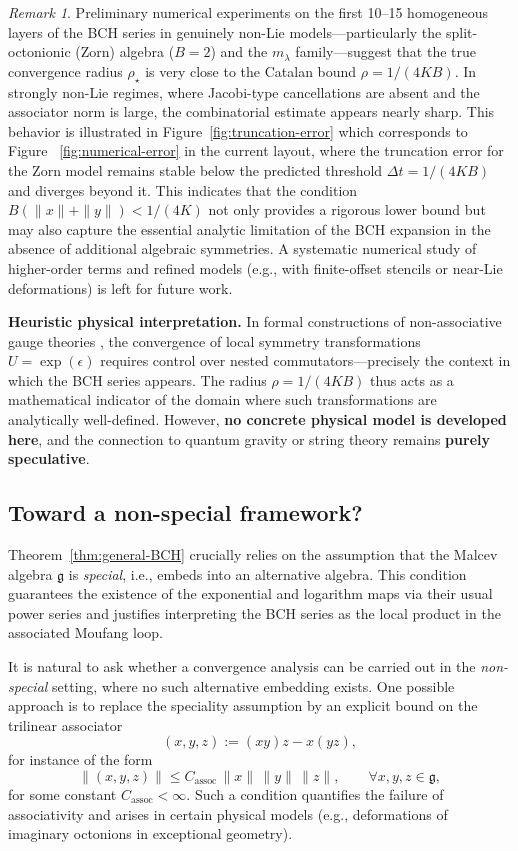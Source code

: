 \documentclass[11pt]{amsart}
\numberwithin{equation}{section}
\theoremstyle{remark}
\newtheorem{remark}[theorem]{Remark}
\begin{document}
\begin{remark}
\label{rem:numerical}
Preliminary numerical experiments on the first 10–15 homogeneous layers of the BCH series in genuinely non-Lie models—particularly the split-octonionic (Zorn) algebra ($B = 2$) and the $m_\lambda$ family—suggest that the true convergence radius $\rho_\star$ is very close to the Catalan bound $\rho = 1/(4KB)$. In strongly non-Lie regimes, where Jacobi-type cancellations are absent and the associator norm is large, the combinatorial estimate appears nearly sharp. This behavior is illustrated in Figure~\ref{fig:truncation-error} which corresponds to Figure ~\ref{fig:numerical-error} in the current layout, where the truncation error for the Zorn model remains stable below the predicted threshold $\Delta t = 1/(4KB)$ and diverges beyond it. This indicates that the condition $B(\|x\| + \|y\|) < 1/(4K)$ not only provides a rigorous lower bound but may also capture the essential analytic limitation of the BCH expansion in the absence of additional algebraic symmetries. A systematic numerical study of higher-order terms and refined models (e.g., with finite-offset stencils or near-Lie deformations) is left for future work.
\end{remark}
\bigskip
\textbf{Heuristic physical interpretation.} In formal 
constructions of non-associative gauge theories 
\cite{GursyTze,Okubo}, the convergence of local symmetry 
transformations $U = \exp(\epsilon)$ requires control over 
nested commutators---precisely the context in which the BCH 
series appears. The radius $\rho = 1/(4KB)$ thus acts as a 
mathematical indicator of the domain where such 
transformations are analytically well-defined. However, 
\textbf{no concrete physical model is developed here}, and 
the connection to quantum gravity or string theory remains 
\textbf{purely speculative}.

\subsection{Toward a non-special framework?}\label{sec:non-special}

Theorem~\ref{thm:general-BCH} crucially relies on the assumption that the Malcev algebra $\mathfrak{g}$ is \emph{special}, i.e., embeds into an alternative algebra. This condition guarantees the existence of the exponential and logarithm maps via their usual power series and justifies interpreting the BCH series as the local product in the associated Moufang loop.

It is natural to ask whether a convergence analysis can be carried out in the \emph{non-special} setting, where no such alternative embedding exists. One possible approach is to replace the speciality assumption by an explicit bound on the trilinear associator
\[
(x,y,z) := (xy)z - x(yz),
\]
for instance of the form
\[
\|(x,y,z)\| \leq C_{\mathrm{assoc}}\,\|x\|\,\|y\|\,\|z\|, \qquad \forall x,y,z \in \mathfrak{g},
\]
for some constant $C_{\mathrm{assoc}} < \infty$. Such a condition quantifies the failure of associativity and arises in certain physical models (e.g., deformations of imaginary octonions in exceptional geometry).
\end{document}
